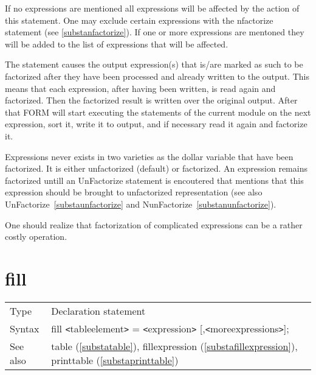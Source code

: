 \noindent If no expressions are mentioned all expressions will be affected 
by the action of this statement. One may exclude certain expressions with 
the nfactorize statement (see \ref{substanfactorize}). If one or more 
expressions are mentoned they will be added to the list of expressions that 
will be affected.

\noindent The statement causes the output expression(s) that is/are marked 
as such to be factorized after they have been processed and already written 
to the output. This means that each expression, after having been written, 
is read again and factorized. Then the factorized result is written over 
the original output. After that FORM will start executing the statements of 
the current module on the next expression, sort it, write it to output, and 
if necessary read it again and factorize it.

\noindent Expressions never exists in two varieties as the dollar variable 
that have been factorized. It is either unfactorized (default) or 
factorized. An expression remains factorized untill an UnFactorize 
statement is encoutered that mentions that this expression should be 
brought to unfactorized representation (see also 
UnFactorize~\ref{substaunfactorize} and 
NunFactorize~\ref{substanunfactorize}).

\noindent One should realize that factorization of complicated expressions 
can be a rather costly operation.

\vspace{10mm}


\section{fill}
\label{substafill}

\noindent \begin{tabular}{ll}
Type & Declaration statement\\
Syntax & fill {\tt<}tableelement{\tt>} = {\tt<}expression{\tt>} [,{\tt<}moreexpressions{\tt>}];
\\ See also & table (\ref{substatable}), 
                fillexpression (\ref{substafillexpression}),
                printtable (\ref{substaprinttable})
\end{tabular} \vspace{4mm}


